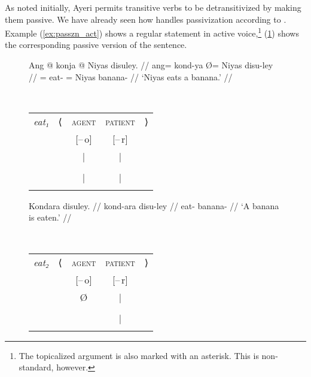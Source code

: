 As noted initially, Ayeri permits transitive verbs to be detransitivized by
making them passive. We have already seen how \Lfg{} handles passivization
according to \citet{bresnan2016}. Example (\ref{ex:passzn_act}) shows a regular
statement in active voice,\footnote{The topicalized argument is also marked
with an asterisk. This is non-standard, however.} (\ref{ex:passzn_pass}) shows
the corresponding passive version of the sentence.

\begin{figure}
\pex\label{ex:passzn}
\a\label{ex:passzn_act}%
\begin{minipage}[t]{.5\remaining}
\begingl
	\gla Ang @ konja {} @ Niyas disuley. //
	\glb ang= kond-ya Ø= Niyas disu-ley //
	\glc \AgtT{}= eat-\TsgM{} \Top{}= Niyas banana-\PargI{} //
	\glft `Niyas eats a banana.' //
\endgl
\end{minipage}
~
\begin{tabular}[t]{>{\itshape}l l c c r}
eat₁
	& ⟨
	& \textsc{agent}
	& \textsc{patient}
	& ⟩
	\\
%
	& %
	& [–\,o]
	& [–\,r]
	& %
	\\

%
	& %
	& |
	& |
	& %
	\\

%
	& %
	& \Subj*
	& \Obj
	& %
	\\

%
	& %
	& |
	& |
	& %
	\\

%
	& %
	& \fw{Niyas}
	& \fw{banana}
	& %
	\\
\end{tabular}

\a\label{ex:passzn_pass}%
\begin{minipage}[t]{.5\remaining}
\begingl
	\gla Kondara disuley. //
	\glb kond-ara disu-ley //
	\glc eat-\TsgI{} banana-\PargI{} //
	\glft `A banana is eaten.' //
\endgl
\end{minipage}
~
\begin{tabular}[t]{>{\itshape}l l c c r}
eat₂
	& ⟨
	& \textsc{agent}
	& \textsc{patient}
	& ⟩
	\\
%
	& %
	& [–\,o]
	& [–\,r]
	& %
	\\

%
	& %
	& Ø
	& |
	& %
	\\

%
	& %
	& %
	& \Subj
	& %
	\\

%
	& %
	& %
	& |
	& %
	\\

%
	& %
	& %
	& \fw{banana}
	& %
	\\
\end{tabular}

\xe
\end{figure}


